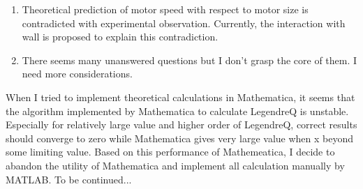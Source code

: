 \documentclass[fontsize=11pt, %
                             paper=a4, %
                             twoside, %
                             captions=tableheading,
                             index=totoc,
                             hyperref]{labbook}
\begin{document}
\begin{addmargin}[4cm]{0cm}
\begin{itemize}
\begin{enumerate}
\item
Theoretical prediction of motor speed with respect to motor size is contradicted with experimental observation. Currently, the interaction with wall is proposed to explain this contradiction.
\item There seems many unanswered questions but I don't grasp the core of them. I need more considerations. 
\end{enumerate}
\end{itemize}
When I tried to implement theoretical calculations in Mathematica, it seems that the algorithm implemented by Mathematica to calculate LegendreQ is unstable. Especially for relatively large value and higher order of LegendreQ, correct results should converge to zero while Mathematica gives very large value when x beyond some limiting value. Based on this performance of Mathemeatica, I decide to abandon the utility of Mathematica and implement all calculation manually by MATLAB. To be continued...





\end{addmargin}
\end{document}
